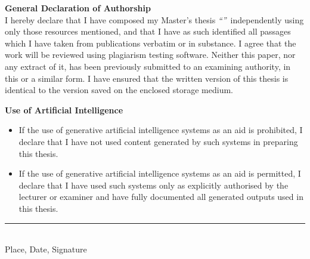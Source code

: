 \textbf{General Declaration of Authorship}\\
I hereby declare that I have composed my Master’s thesis
\makeatletter\textit{``\@title''}\makeatother\ independently using
only those resources mentioned, and that I have as such identified
all passages which I have taken from publications verbatim or in
substance. I agree that the work will be reviewed using plagiarism
testing software. Neither this paper, nor any extract of it, has been
previously submitted to an examining authority, in this or a similar
form. I have ensured that the written version of this thesis is
identical to the version saved on the enclosed storage medium.

\textbf{Use of Artificial Intelligence}
\begin{itemize}
    \item[a)] If the use of generative artificial intelligence systems as an
              aid is prohibited, I declare that I have not used content
              generated by such systems in preparing this thesis.
    \item[b)] If the use of generative artificial intelligence systems as an
              aid is permitted, I declare that I have used such systems only
              as explicitly authorised by the lecturer or examiner and have
              fully documented all generated outputs used in this thesis.
\end{itemize}

\begin{flushright}
    \vspace{2cm} %
    \rule{10cm}{0.4pt} \\ %
    Place, Date, Signature \\[1cm] %
\end{flushright}